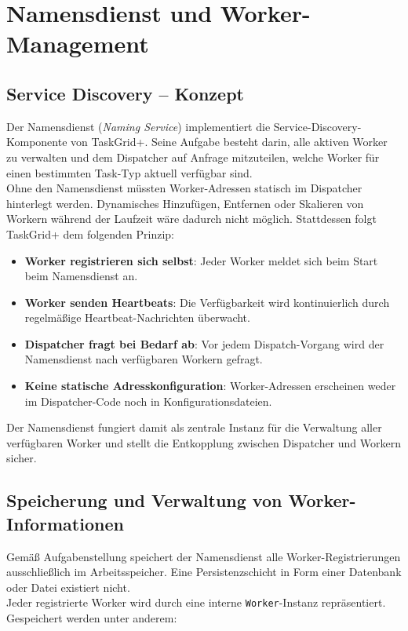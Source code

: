 \section{Namensdienst und Worker-Management}
\label{sec:namensdienst}

\subsection{Service Discovery -- Konzept}

Der Namensdienst (\emph{Naming Service}) implementiert die Service-Discovery-Komponente von TaskGrid+.
Seine Aufgabe besteht darin, alle aktiven Worker zu verwalten und dem Dispatcher auf Anfrage mitzuteilen, welche Worker für einen bestimmten Task-Typ aktuell verfügbar sind.
\\
Ohne den Namensdienst müssten Worker-Adressen statisch im Dispatcher hinterlegt werden.
Dynamisches Hinzufügen, Entfernen oder Skalieren von Workern während der Laufzeit wäre dadurch nicht möglich.
Stattdessen folgt TaskGrid+ dem folgenden Prinzip:

\begin{itemize}
	\item \textbf{Worker registrieren sich selbst}: Jeder Worker meldet sich beim Start beim Namensdienst an.
	\item \textbf{Worker senden Heartbeats}: Die Verfügbarkeit wird kontinuierlich durch regelmäßige Heartbeat-Nachrichten überwacht.
	\item \textbf{Dispatcher fragt bei Bedarf ab}: Vor jedem Dispatch-Vorgang wird der Namensdienst nach verfügbaren Workern gefragt.
	\item \textbf{Keine statische Adresskonfiguration}: Worker-Adressen erscheinen weder im Dispatcher-Code noch in Konfigurationsdateien.
\end{itemize}
Der Namensdienst fungiert damit als zentrale Instanz für die Verwaltung aller verfügbaren Worker und stellt die Entkopplung zwischen Dispatcher und Workern sicher.

\subsection{Speicherung und Verwaltung von Worker-Informationen}

Gemäß Aufgabenstellung speichert der Namensdienst alle Worker-Registrierungen ausschließlich im Arbeitsspeicher.
Eine Persistenzschicht in Form einer Datenbank oder Datei existiert nicht.
\\
Jeder registrierte Worker wird durch eine interne \texttt{Worker}-Instanz repräsentiert.
Gespeichert werden unter anderem:

